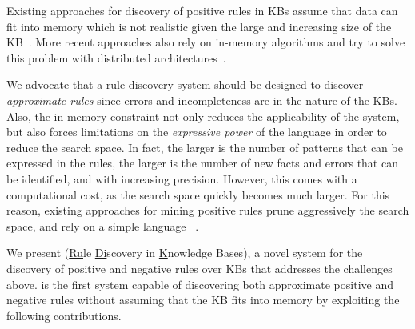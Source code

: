 Existing approaches for discovery of positive rules in KBs assume that data can fit into memory which is not realistic given the large and increasing size of the KB~\cite{abedjan2014amending,galarraga2015fast}. More recent approaches also rely on in-memory algorithms and try to solve this problem with distributed architectures~\cite{Chen:2016,DBLP:conf/sigmod/FaridRIHC16}.



\vspace{1ex}
We advocate that a rule discovery system should be designed to discover {\em approximate rules} since errors and incompleteness are in the nature of the KBs. Also, the in-memory constraint not only reduces the applicability of the system, but also forces limitations on the {\em expressive power} of the language in order to reduce the search space.
In fact, the larger is the number of patterns that can be expressed in the rules, %
the larger is the number of new facts and errors that can be identified, and with increasing precision. However, this comes with a computational cost, as the search space quickly becomes much larger. For this reason, existing approaches for mining positive rules prune aggressively the search space, and rely on a simple language%
~\cite{Chen:2016,abedjan2014amending,galarraga2015fast}.

\vspace{1ex}
We present \krd (\underline{Ru}le \underline{Di}scovery in \underline{K}nowledge Bases), a novel system for the discovery of positive and negative rules %
over KBs that addresses the challenges above.  
\krd is the first system capable of discovering both approximate positive and negative rules without
assuming that the KB fits into memory by exploiting the following contributions.

